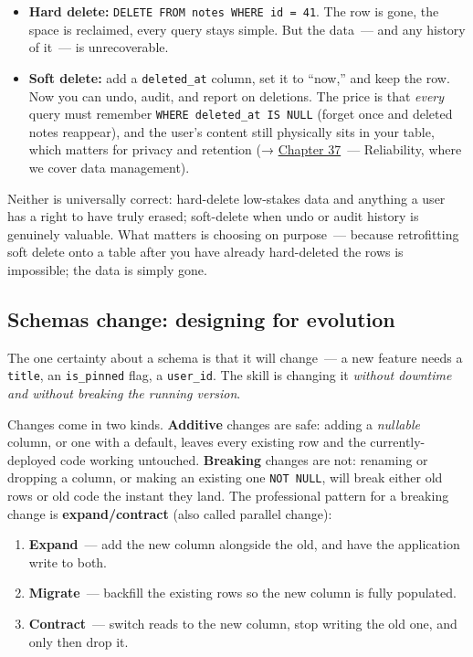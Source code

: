 \begin{itemize}
\tightlist
\item
  \textbf{Hard delete:} \texttt{DELETE\ FROM\ notes\ WHERE\ id\ =}\allowbreak{}\texttt{\ 41}. The row is gone, the space is reclaimed, every query stays simple. But the data~--- and any history of it~--- is unrecoverable.
\item
  \textbf{Soft delete:} add a \texttt{deleted\_at} column, set it to ``now,'' and keep the row. Now you can undo, audit, and report on deletions. The price is that \emph{every} query must remember \texttt{WHERE\ deleted\_}\allowbreak{}\texttt{at\ IS\ NULL} (forget once and deleted notes reappear), and the user's content still physically sits in your table, which matters for privacy and retention (→ \hyperref[ch:37-reliability]{Chapter 37}~--- Reliability, where we cover data management).
\end{itemize}

\noindent{}Neither is universally correct: hard-delete low-stakes data and anything a user has a right to have truly erased; soft-delete when undo or audit history is genuinely valuable. What matters is choosing on purpose~--- because retrofitting soft delete onto a table after you have already hard-deleted the rows is impossible; the data is simply gone.

\subsection*{Schemas change: designing for evolution}\label{06-local-dependencies:schemas-change-designing-for-evolution}

The one certainty about a schema is that it will change~--- a new feature needs a \texttt{title}, an \texttt{is\_pinned} flag, a \texttt{user\_id}. The skill is changing it \emph{without downtime and without breaking the running version}.

Changes come in two kinds. \textbf{Additive} changes are safe: adding a \emph{nullable} column, or one with a default, leaves every existing row and the currently-deployed code working untouched. \textbf{Breaking} changes are not: renaming or dropping a column, or making an existing one \texttt{NOT\ NULL}, will break either old rows or old code the instant they land. The professional pattern for a breaking change is \textbf{expand/contract} (also called parallel change):

\begin{enumerate}
\def\labelenumi{\arabic{enumi}.}
\tightlist
\item
  \textbf{Expand}~--- add the new column alongside the old, and have the application write to both.
\item
  \textbf{Migrate}~--- backfill the existing rows so the new column is fully populated.
\item
  \textbf{Contract}~--- switch reads to the new column, stop writing the old one, and only then drop it.
\end{enumerate}

